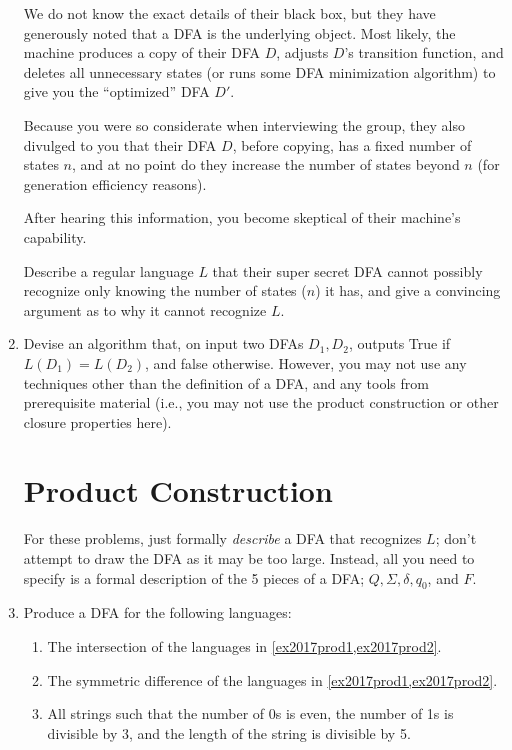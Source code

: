 \begin{enumerate}
We do not know the exact details of their black box, but they have generously noted that a DFA is the underlying object.
Most likely, the machine produces a copy of their DFA $D$, adjusts $D$'s transition function, and deletes all unnecessary states (or runs some DFA minimization algorithm) to give you the ``optimized'' DFA $D'$.

Because you were so considerate when interviewing the group, they also divulged to you that their DFA $D$, before copying, has a fixed number of states $n$, and at no point do they increase the number of states beyond $n$ (for generation efficiency reasons).

After hearing this information, you become skeptical of their machine's capability.

Describe a regular language $L$ that their super secret DFA cannot possibly recognize only knowing the number of states ($n$) it has, and give a convincing argument as to why it cannot recognize $L$.

\item \label{dfa_equal_no_product}  Devise an algorithm that, on input two DFAs $D_1, D_2$, outputs True if $L(D_1) = L(D_2)$, and false otherwise.
However, you may not use any techniques other than the definition of a DFA, and any tools from prerequisite material (i.e., you may not use the product construction or other closure properties here).

\section{Product Construction}

For these problems, just formally \emph{describe} a DFA that recognizes $L$; don't attempt to draw the DFA as it may be too large. 
Instead, all you need to specify is a formal description of the 5 pieces of a DFA; $Q, \Sigma, \delta, q_0$, and $F$.

\item Produce a DFA for the following languages:
\begin{enumerate}


\item {} The intersection of the languages in \cref{ex2017prod1,ex2017prod2}.

\item {} The symmetric difference of the languages in \cref{ex2017prod1,ex2017prod2}.

\item {} All strings such that the number of 0s is even, the number of 1s is divisible by 3, and the length of the string is divisible by 5.


\end{enumerate}
\end{enumerate}
